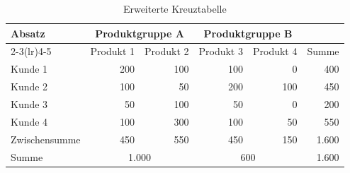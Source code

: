 \begin{table}[htbp]
  \centering
  \caption{Erweiterte Kreuztabelle}
  \label{tab:Erweiterte_Kreuztabelle}
  \small
  \setlength{\tabcolsep}{4pt}
  \begin{tabular}{lrrrrr}
    \toprule
    Absatz & \multicolumn{2}{c}{Produktgruppe A} & \multicolumn{2}{c}{Produktgruppe B} & \\
    \cmidrule(lr){2-3}\cmidrule(lr){4-5}
     & Produkt 1 & Produkt 2 & Produkt 3 & Produkt 4 & Summe \\
    \midrule
    Kunde 1 & 200 & 100 & 100 & 0 & 400 \\
    Kunde 2 & 100 & 50 & 200 & 100 & 450 \\
    Kunde 3 & 50 & 100 & 50 & 0 & 200 \\
    Kunde 4 & 100 & 300 & 100 & 50 & 550 \\
    \midrule
    Zwischensumme & 450 & 550 & 450 & 150 & 1.600 \\
    Summe & \multicolumn{2}{c}{1.000} & \multicolumn{2}{c}{600} & 1.600 \\
    \bottomrule
  \end{tabular}
\end{table}
